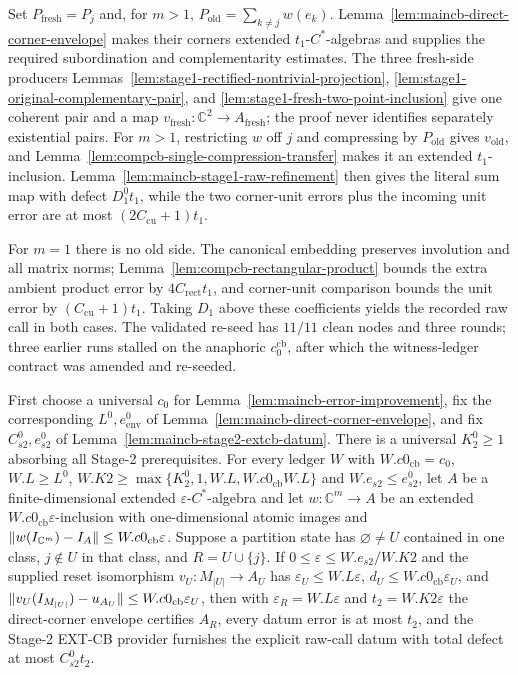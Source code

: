 Set $P_{\mathrm{fresh}}=P_j$ and, for $m>1$,
$P_{\mathrm{old}}=\sum_{k\ne j}w(e_k)$.  Lemma~\ref{lem:maincb-direct-corner-envelope}
makes their corners extended $t_{1}$-$C^{*}$-algebras and supplies the required
subordination and complementarity estimates.  The three fresh-side producers
Lemmas~\ref{lem:stage1-rectified-nontrivial-projection},
\ref{lem:stage1-original-complementary-pair}, and
\ref{lem:stage1-fresh-two-point-inclusion} give one coherent pair and a map
$v_{\mathrm{fresh}}:\mathbb C^{2}\to A_{\mathrm{fresh}}$; the proof never identifies
separately existential pairs.  For $m>1$, restricting $w$ off $j$ and compressing by
$P_{\mathrm{old}}$ gives $v_{\mathrm{old}}$, and
Lemma~\ref{lem:compcb-single-compression-transfer} makes it an extended
$t_{1}$-inclusion.  Lemma~\ref{lem:maincb-stage1-raw-refinement} then gives the literal sum
map with defect $D_{1}^{0}t_{1}$, while the two corner-unit errors plus the incoming unit
error are at most $(2C_{\mathrm{cu}}+1)t_{1}$.

For $m=1$ there is no old side.  The canonical embedding preserves involution and all
matrix norms; Lemma~\ref{lem:compcb-rectangular-product} bounds the extra ambient product
error by $4C_{\mathrm{rect}}t_{1}$, and corner-unit comparison bounds the unit error by
$(C_{\mathrm{cu}}+1)t_{1}$.  Taking $D_{1}$ above these coefficients yields the recorded
raw call in both cases.  The validated re-seed has $11/11$ clean nodes and three rounds;
three earlier runs stalled on the anaphoric $c_{0}^{\mathrm{cb}}$, after which the
witness-ledger contract was amended and re-seeded.

\begin{lemma}\label{lem:maincb-stage2-call-envelope}
First choose a universal $c_{0}$ for Lemma~\ref{lem:maincb-error-improvement}, fix the
corresponding $L^{0},e_{\mathrm{env}}^{0}$ of
Lemma~\ref{lem:maincb-direct-corner-envelope}, and fix $C_{s2}^{0},e_{s2}^{0}$ of
Lemma~\ref{lem:maincb-stage2-extcb-datum}.  There is a universal $K_{2}^{0}\ge1$ absorbing
all Stage-2 prerequisites.  For every ledger $W$ with $W.c0_{\mathrm{cb}}=c_{0}$,
$W.L\ge L^{0}$, $W.K2\ge\max\{K_{2}^{0},1,W.L,W.c0_{\mathrm{cb}}W.L\}$ and
$W.e_{s2}\le e_{s2}^{0}$, let $A$ be a finite-dimensional extended
$\varepsilon$-$C^{*}$-algebra and let $w:\mathbb C^m\to A$ be an extended
$W.c0_{\mathrm{cb}}\varepsilon$-inclusion with one-dimensional atomic images and
$\lVert w(I_{\mathbb C^m})-I_A\rVert\le W.c0_{\mathrm{cb}}\varepsilon$.  Suppose a partition
state has $\varnothing\ne U$ contained in one class, $j\notin U$ in that class, and
$R=U\cup\{j\}$.  If $0\le\varepsilon\le W.e_{s2}/W.K2$ and the supplied reset isomorphism
$v_U:M_{|U|}\to A_U$ has $\varepsilon_U\le W.L\varepsilon$,
$d_U\le W.c0_{\mathrm{cb}}\varepsilon_U$, and
$\lVert v_U(I_{M_{|U|}})-u_{A_U}\rVert\le W.c0_{\mathrm{cb}}\varepsilon_U$, then with
$\varepsilon_R=W.L\varepsilon$ and $t_{2}=W.K2\varepsilon$ the direct-corner envelope
certifies $A_R$, every datum error is at most $t_{2}$, and the Stage-2 EXT-CB provider
furnishes the explicit raw-call datum with total defect at most $C_{s2}^{0}t_{2}$.
\end{lemma}

